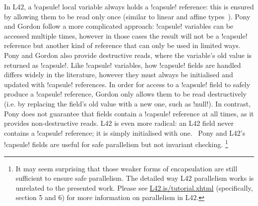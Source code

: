 In L42, a \Q!capsule! local variable always holds a \Q!capsule! reference: this is ensured by allowing them to be read only once (similar to linear and affine types~\cite{boyland2001alias}). 
Pony and Gordon \etal follow a more complicated approach: \Q!capsule! variables can be accessed multiple times, however in those cases the result will not be a \Q!capsule! reference but another kind of reference that can only be used in limited ways. Pony and Gordon also provide destructive reads, where the variable's old value is returned as \Q!capsule!.
Like \Q!capsule! variables, how \Q!capsule! fields are handled differs widely in the literature, however they must always be initialised and updated with \Q!capsule! references. In order for access to a \Q!capsule! field to safely produce a \Q!capsule! reference, Gordon \etal only allows them to be read destructively (i.e. by replacing the field's old value with a new one, such as \Q!null!). 
In contrast, 
Pony does not guarantee that \Q@capsule@ fields contain a \Q!capsule! reference at all times, as it provides non-destructive reads.
L42 is even more radical: an L42 \Q@capsule@ field never contains a \Q!capsule! reference; it is simply initialised with one.~\cite{ServettoEtAl13a,GIANNINI2019145}
Pony and L42's \Q!capsule! fields
 are useful for safe parallelism but not invariant checking. \footnote{It may seem surprising that 
those weaker forms of encapsulation are still sufficient to ensure safe parallelism. 
The detailed way L42 parallelism works is unrelated to the presented work.
Please see \url{L42.is/tutorial.xhtml} (specifically, section 5 and 6) for more information on parallelism in L42.
}

